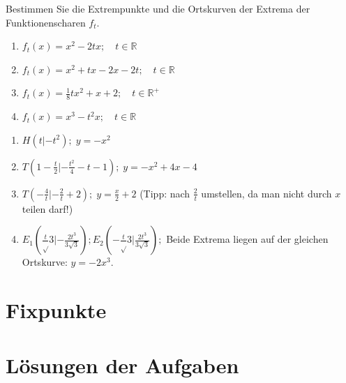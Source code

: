 \documentclass[12pt,a4paper,twoside,fleqn]{article}
\begin{document}
\begin{question}
  Bestimmen Sie die Extrempunkte und die Ortskurven der Extrema der
  Funktionenscharen $f_t$.
  \begin{multicols}{2}
    \begin{enumerate}
    \item $f_t(x)=x^2-2tx;\quad t\in\mathbb{R}$
    \item $f_t(x)=x^2+tx-2x-2t;\quad t\in\mathbb{R}$
    \item $f_t(x)=\frac 1 8 tx^2+x+2;\quad t\in\mathbb{R}^+$
    \item $f_t(x)=x^3-t^2x;\quad t\in\mathbb{R}$
    \end{enumerate}
  \end{multicols}
\end{question}
\begin{solution}
  \begin{multicols}{2}
    \begin{enumerate}
    \item $H(t|-t^2);\;y=-x^2$
    \item $T(1-\frac t 2|-\frac {t^2} 4 -t -1);\; y=-x^2+4x-4$
    \item $T(-\frac 4 t|-\frac 2 t+2);\; y=\frac x 2 +2$ (Tipp: nach
      $\frac 2 t$ umstellen, da man nicht durch $x$ teilen darf!)
      \item $E_1(\frac t \sqrt{3}|-\frac{2t^3}{3\sqrt{3}}); 
             E_2(-\frac t \sqrt{3}|\frac{2t^3}{3\sqrt{3}});$
             Beide Extrema liegen auf der gleichen Ortskurve:
             $y=-2x^3$.
    \end{enumerate}
  \end{multicols}
\end{solution}

\section{Fixpunkte}

 
\section{Lösungen der Aufgaben}
{\scriptsize\printsolutions}
\end{document}
